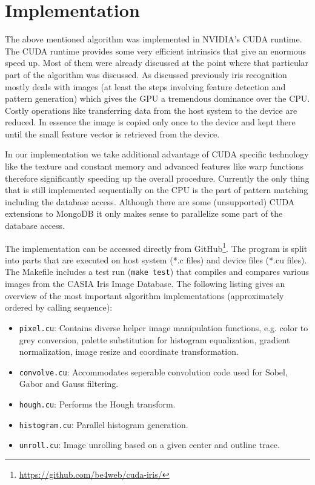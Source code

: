 \documentclass[journal]{IEEEtran}
\begin{document}
\section{Implementation}

The above mentioned algorithm was implemented in NVIDIA's CUDA runtime. The CUDA runtime provides some very efficient intrinsics that give an enormous speed up. Most of them were already discussed at the point where that particular part of the algorithm was discussed. As discussed previously iris recognition mostly deals with images (at least the steps involving feature detection and pattern generation) which gives the GPU a tremendous dominance over the CPU. Costly operations like transferring data from the host system to the device are reduced. In essence the image is copied only once to the device and kept there until the small feature vector is retrieved from the device.
\par In our implementation we take additional advantage of CUDA specific technology like the texture and constant memory and advanced features like warp functions therefore significantly speeding up the overall procedure. Currently the only thing that is still implemented sequentially on the CPU is the part of pattern matching including the database access. Although there are some (unsupported) CUDA extensions to MongoDB it only makes sense to parallelize some part of the database access.
\par The implementation can be accessed directly from GitHub\footnote{\url{https://github.com/be4web/cuda-iris/}}. The program is split into parts that are executed on host system (*.c files) and device files (*.cu files). The Makefile includes a test run (\verb+make test+) that compiles and compares various images from the CASIA Iris Image Database. The following listing gives an overview of the most important algorithm implementations (approximately ordered by calling sequence):
\begin{itemize}
	\item \verb+pixel.cu+: Contains diverse helper image manipulation functions, e.g. color to grey conversion, palette substitution for histogram equalization, gradient normalization, image resize and coordinate transformation.
	\item \verb+convolve.cu+: Accommodates seperable convolution code used for Sobel, Gabor and Gauss filtering.
	\item \verb+hough.cu+: Performs the Hough transform.
	\item \verb+histogram.cu+: Parallel histogram generation. 
	\item \verb+unroll.cu+: Image unrolling based on a given center and outline trace.
\end{itemize}
\end{document}
